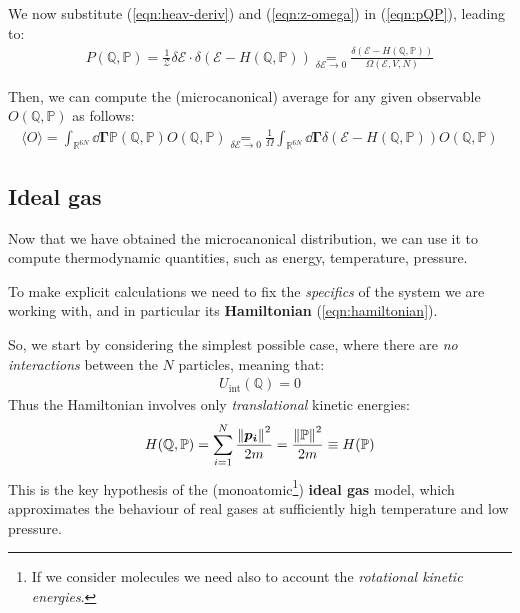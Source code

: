 \documentclass[../../main.tex]{subfiles}
\begin{document}
We now substitute (\ref{eqn:heav-deriv}) and (\ref{eqn:z-omega}) in (\ref{eqn:pQP}), leading to:
\begin{align} \label{eqn:pQP1}
    P(\mathbb{Q}, \mathbb{P}) = \frac{1}{\mathcal{Z}} \delta \mathcal{E}\cdot \delta (\mathcal{E}- H(\mathbb{Q}, \mathbb{P})) \underset{\delta \mathcal{E} \to 0}{=} \frac{\delta(\mathcal{E}-H(\mathbb{Q}, \mathbb{P}))}{\Omega(\mathcal{E}, V, N)} 
\end{align}

Then, we can compute the (microcanonical) average for any given observable $O(\mathbb{Q},\mathbb{P})$ as follows:
\begin{align}\label{eqn:micro-average}
    \langle O \rangle = \int_{\mathbb{R}^{6N}} \dd{\bm{\Gamma}} \mathbb{P}(\mathbb{Q}, \mathbb{P}) O(\mathbb{Q}, \mathbb{P}) \underset{\delta \mathcal{E} \to 0}{=} \frac{1}{\Omega} \int_{\mathbb{R}^{6N}} \dd{\bm{\Gamma}} \delta(\mathcal{E}- H(\mathbb{Q},\mathbb{P})) O(\mathbb{Q},\mathbb{P})
\end{align}

\subsection{Ideal gas}
Now that we have obtained the microcanonical distribution, we can use it to compute thermodynamic quantities, such as energy, temperature, pressure.

\medskip

To make explicit calculations we need to fix the \textit{specifics} of the system we are working with, and in particular its \textbf{Hamiltonian} (\ref{eqn:hamiltonian}). 

So, we start by considering the simplest possible case, where there are \textit{no interactions} between the $N$ particles, meaning that:
\begin{align} \label{eqn:no-interaction}
    U_{\mathrm{int}}(\mathbb{Q}) = 0
\end{align} 
Thus the Hamiltonian involves only \textit{translational} kinetic energies:
\begin{align}\label{eqn:h-ideal-gas}
    H(\mathbb{Q},\mathbb{P}) = \sum_{i=1}^N \frac{\norm{\bm{p_i}}^2}{2m} = \frac{\norm{\mathbb{P}}^2}{2m} \equiv H(\mathbb{P})
\end{align}
This is the key hypothesis of the (monoatomic\footnote{If we consider molecules we need also to account the \textit{rotational kinetic energies}.}) \textbf{ideal gas} model, which approximates the behaviour of real gases at sufficiently high temperature and low pressure.
\end{document}
